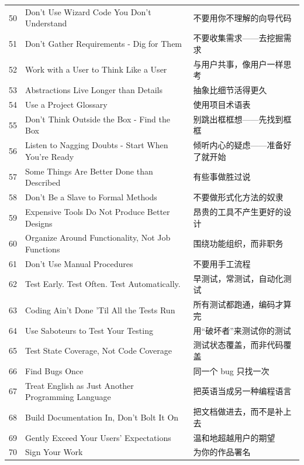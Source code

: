\begin{longtable}{@{}r p{} p{}@{}}
50 & Don't Use Wizard Code You Don't Understand & 不要用你不理解的向导代码 \\
51 & Don't Gather Requirements - Dig for Them & 不要收集需求——去挖掘需求 \\
52 & Work with a User to Think Like a User & 与用户共事，像用户一样思考 \\
53 & Abstractions Live Longer than Details & 抽象比细节活得更久 \\
54 & Use a Project Glossary & 使用项目术语表 \\
55 & Don't Think Outside the Box - Find the Box & 别跳出框框想——先找到框框 \\
56 & Listen to Nagging Doubts - Start When You're Ready & 倾听内心的疑虑——准备好了就开始 \\
57 & Some Things Are Better Done than Described & 有些事做胜过说 \\
58 & Don't Be a Slave to Formal Methods & 不要做形式化方法的奴隶 \\
59 & Expensive Tools Do Not Produce Better Designs & 昂贵的工具不产生更好的设计 \\
60 & Organize Around Functionality, Not Job Functions & 围绕功能组织，而非职务 \\
61 & Don't Use Manual Procedures & 不要用手工流程 \\
62 & Test Early. Test Often. Test Automatically. & 早测试，常测试，自动化测试 \\
63 & Coding Ain't Done 'Til All the Tests Run & 所有测试都跑通，编码才算完 \\
64 & Use Saboteurs to Test Your Testing & 用“破坏者”来测试你的测试 \\
65 & Test State Coverage, Not Code Coverage & 测试状态覆盖，而非代码覆盖 \\
66 & Find Bugs Once & 同一个 bug 只找一次 \\
67 & Treat English as Just Another Programming Language & 把英语当成另一种编程语言 \\
68 & Build Documentation In, Don't Bolt It On & 把文档做进去，而不是补上去 \\
69 & Gently Exceed Your Users' Expectations & 温和地超越用户的期望 \\
70 & Sign Your Work & 为你的作品署名 \\
\bottomrule
\end{longtable}
